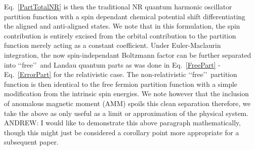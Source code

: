 \documentclass[Universe,article,submit,moreauthors,pdftex]{Definitions/mdpi}
\newcommand*{\req}[1]{Eq.~{\eqref{#1}}}
\newcommand*{\xred}{\color{red}}
\begin{document}
\req{PartTotalNR} is then the traditional NR quantum harmonic oscillator partition function with a spin dependant chemical potential shift differentiating the aligned and anti-aligned states. We note that in this formulation, the spin contribution is entirely excised from the orbital contribution to the partition function merely acting as a constant coefficient. Under Euler-Maclaurin integration, the now spin-independant Boltzmann factor can be further separated into \lq\lq free\rq\rq\ and Landau quantum parts as was done in \req{FreePart} - \req{ErrorPart} for the relativistic case. The non-relativistic \lq\lq free\rq\rq\ partition function is then identical to the free fermion partition function with a simple modification from the intrinsic spin energies. We note however that the inclusion of anomalous magnetic moment (AMM) spoils this clean separation therefore, we take the above as only useful as a limit or approximation of the physical system. {\xred ANDREW: I would like to demonstrate this above paragraph mathematically, though this might just be considered a corollary point more appropriate for a subsequent paper.}
\end{document}
